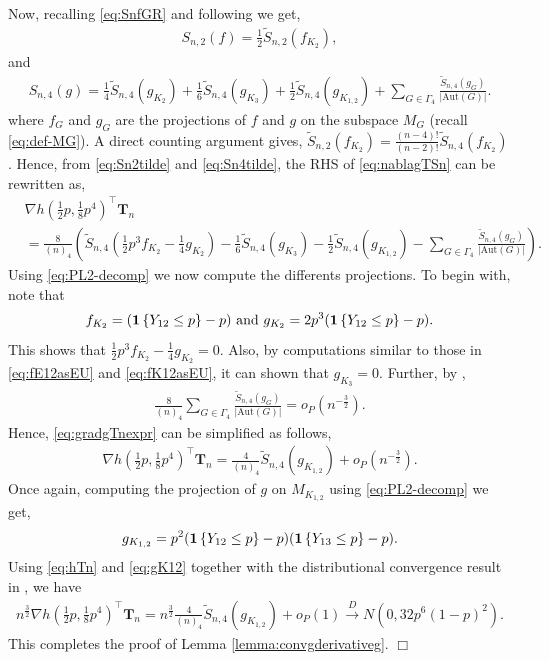 \documentclass[11pt,reqno]{amsart}
\numberwithin{equation}{section}
\newcommand{\one}{{\bf 1}}
\newcommand\Aut{\mathrm{Aut}}
\newcommand\dto{\overset{D}{\rightarrow}}
\theoremstyle{definition}
\begin{document}
Now, recalling \eqref{eq:SnfGR} and following \cite[Example 2]{janson1991asymptotic} we get,
\begin{align}\label{eq:Sn2tilde}
    S_{n,2}(f) = \frac{1}{2}\tilde{S}_{n,2}(f_{K_{2}}),
\end{align}
and 
\begin{align}\label{eq:Sn4tilde}
    S_{n,4}(g) = \frac{1}{4}\tilde S_{n,4}(g_{K_{2}}) + \frac{1}{6}\tilde S_{n,4}(g_{K_{3}}) + \frac{1}{2}\tilde S_{n,4}(g_{K_{1, 2}}) + \sum_{G\in \Gamma_{4}}\frac{\tilde S_{n,4}(g_{G})}{|\Aut{(G)}|} .
\end{align}
where $f_G$ and $g_G$ are the projections of $f$ and $g$ on the subspace $M_G$ (recall \eqref{eq:def-MG}). A direct counting argument gives, $\tilde{S}_{n,2}(f_{K_{2}}) = \frac{(n-4)!}{(n-2)!}\tilde S_{n,4}(f_{K_{2}})$. Hence, from \eqref{eq:Sn2tilde} and \eqref{eq:Sn4tilde}, the RHS of \eqref{eq:nablagTSn} can be rewritten as, 
\begin{align}\label{eq:gradgTnexpr}
    & \nabla h(\tfrac{1}{2} p,\tfrac{1}{8} p^4)^{\top}\bm{T}_{n} \nonumber \\ 
    & = \frac{8}{(n)_{4}} \left( \tilde S_{n,4}\left( \frac{1}{2} p^{3} f_{K_{2}} -  \frac{1}{4} g_{K_{2}} \right)  -  \frac{1}{6}\tilde S_{n,4}( g_{K_{3}}) - \frac{1}{2}\tilde S_{n,4}( g_{K_{1, 2}}) - \sum_{G\in \Gamma_{4}}\frac{\tilde S_{n,4}( g_{G})}{|\Aut{(G)}|} \right) .
\end{align} 
Using \eqref{eq:PL2-decomp} we now compute the differents projections. To begin with, note that 
$$f_{K_{2}} = (\one\left\{Y_{12}\leq p\right\}-p) \text{ and } g_{K_{2}} = 2p^{3}(\one\left\{Y_{12}\leq p\right\}-p).$$ This shows that $\frac{1}{2}p^{3} f_{K_{2}} - \frac{1}{4} g_{K_{2}}=0$. Also, by computations similar to those in \eqref{eq:fE12asEU} and \eqref{eq:fK12asEU}, it can shown that $g_{K_{3}} = 0$. Further, by  \cite[Lemma 4]{janson1991asymptotic},
\begin{align*}
    \frac{8}{(n)_{4}}\sum_{G\in \Gamma_{4}}\frac{\tilde S_{n,4}(g_{G})}{|\Aut{(G)}|} = o_P(n^{-\frac{3}{2}}).
\end{align*}
Hence, \eqref{eq:gradgTnexpr} can be simplified as follows,
\begin{align}\label{eq:hTn}
    \nabla h(\tfrac{1}{2} p,\tfrac{1}{8} p^4)^{\top}\bm{T}_{n} = \frac{4}{(n)_{4}}\tilde S_{n,4}(g_{K_{1, 2}}) + o_P(n^{-\frac{3}{2}}).
\end{align}
Once again, computing the projection of $g$ on $M_{K_{1, 2}}$ using \eqref{eq:PL2-decomp} we get, 
\begin{align}\label{eq:gK12}
g_{K_{1, 2}} = p^{2}(\one\left\{Y_{12}\leq p\right\}-p)(\one\left\{Y_{13}\leq p\right\}-p). 
\end{align}
Using \eqref{eq:hTn} and \eqref{eq:gK12} together with the distributional convergence result in \cite[Lemma 7]{janson1991asymptotic}, we have    
\begin{align*}
    n^\frac{3}{2}\nabla h(\tfrac{1}{2} p,\tfrac{1}{8} p^4)^{\top}\bm{T}_{n} = n^\frac{3}{2}\frac{4}{(n)_{4}}\tilde S_{n,4}(g_{K_{1, 2}}) + o_P(1)\dto N\left(0,32p^{6}(1-p)^{2}\right) . 
\end{align*}
This completes the proof of Lemma \ref{lemma:convgderivativeg}. \hfill $\Box$
\end{document}
